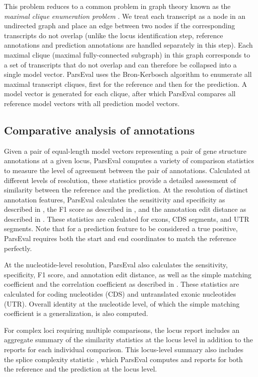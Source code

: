 This problem reduces to a common problem in graph theory known as the \emph{maximal clique enumeration problem} \citep{Bron}.
We treat each transcript as a node in an undirected graph and place an edge between two nodes if the corresponding transcripts do not overlap (unlike the locus identification step, reference annotations and prediction annotations are handled separately in this step).
Each maximal clique (maximal fully-connected subgraph) in this graph corresponds to a set of transcripts that do not overlap and can therefore be collapsed into a single model vector.
ParsEval uses the Bron-Kerbosch algorithm \citep{Bron} to enumerate all maximal transcript cliques, first for the reference and then for the prediction.
A model vector is generated for each clique, after which ParsEval compares all reference model vectors with all prediction model vectors.


\subsection{Comparative analysis of annotations}
Given a pair of equal-length model vectors representing a pair of gene structure annotations at a given locus, ParsEval computes a variety of comparison statistics to measure the level of agreement between the pair of annotations.
Calculated at different levels of resolution, these statistics provide a detailed assessment of similarity between the reference and the prediction.
At the resolution of distinct annotation features, ParsEval calculates the sensitivity and specificity as described in \citep{Burset}, the F1 score as described in \citep{Zhao}, and the annotation edit distance as described in \citep{AED,Holt}.
These statistics are calculated for exons, CDS segments, and UTR segments.
Note that for a prediction feature to be considered a true positive, ParsEval requires both the start and end coordinates to match the reference perfectly.

At the nucleotide-level resolution, ParsEval also calculates the sensitivity, specificity, F1 score, and annotation edit distance, as well as the simple matching coefficient and the correlation coefficient as described in \citep{Burset}.
These statistics are calculated for coding nucleotides (CDS) and untranslated exonic nucleotides (UTR).
Overall identity at the nucleotide level, of which the simple matching coefficient is a generalization, is also computed.

For complex loci requiring multiple comparisons, the locus report includes an aggregate summary of the similarity statistics at the locus level in addition to the reports for each individual comparison.
This locus-level summary also includes the splice complexity statistic \citep{AED}, which ParsEval computes and reports for both the reference and the prediction at the locus level.

